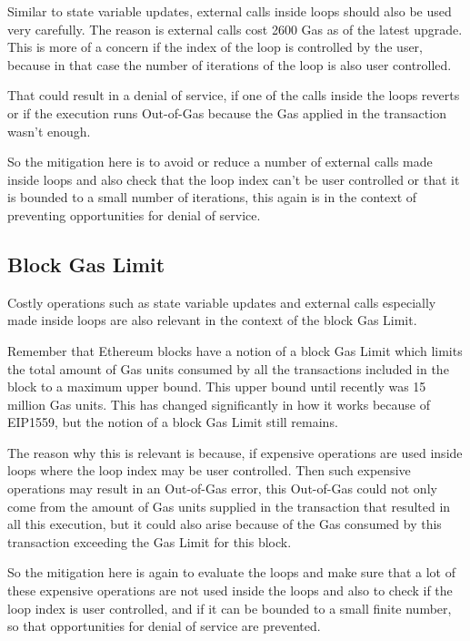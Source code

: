 Similar to state variable updates, external calls inside loops should
also be used very carefully. The reason is external calls cost 2600 Gas
as of the latest upgrade. This is more of a concern if the index of the
loop is controlled by the user, because in that case the number of
iterations of the loop is also user controlled.

That could result in a denial of service, if one of the calls inside the
loops reverts or if the execution runs Out-of-Gas because the Gas
applied in the transaction wasn't enough.

So the mitigation here is to avoid or reduce a number of external calls
made inside loops and also check that the loop index can't be user
controlled or that it is bounded to a small number of iterations, this
again is in the context of preventing opportunities for denial of
service.

\subsection{Block Gas Limit}\label{block-gas-limit}

Costly operations such as state variable updates and external calls
especially made inside loops are also relevant in the context of the
block Gas Limit.

Remember that Ethereum blocks have a notion of a block Gas Limit which
limits the total amount of Gas units consumed by all the transactions
included in the block to a maximum upper bound. This upper bound until
recently was 15 million Gas units. This has changed significantly in how
it works because of EIP1559, but the notion of a block Gas Limit still
remains.

The reason why this is relevant is because, if expensive operations are
used inside loops where the loop index may be user controlled. Then such
expensive operations may result in an Out-of-Gas error, this Out-of-Gas
could not only come from the amount of Gas units supplied in the
transaction that resulted in all this execution, but it could also arise
because of the Gas consumed by this transaction exceeding the Gas Limit
for this block.

So the mitigation here is again to evaluate the loops and make sure that
a lot of these expensive operations are not used inside the loops and
also to check if the loop index is user controlled, and if it can be
bounded to a small finite number, so that opportunities for denial of
service are prevented.

